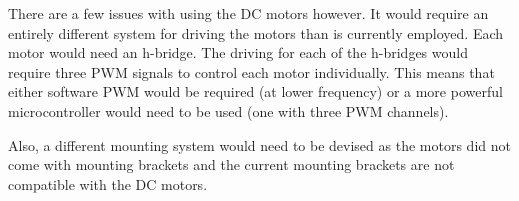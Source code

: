 There are a few issues with using the DC motors however.  It would require an entirely different system for driving the motors than is currently employed.  Each motor would need an h-bridge.  The driving for each of the h-bridges would require three PWM signals to control each motor individually.  This means that either software PWM would be required (at lower frequency) or a more powerful microcontroller would need to be used (one with three PWM channels).

Also, a different mounting system would need to be devised as the motors did not come with mounting brackets and the current mounting brackets are not compatible with the DC motors.

